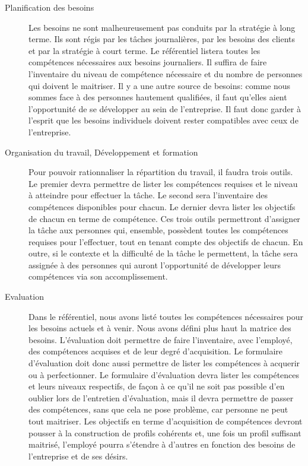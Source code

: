 \begin{description}
  \item[Planification des besoins] 
  Les besoins ne sont malheureusement pas conduits par la stratégie à long terme. Ils sont régis par les tâches journalières, par les besoins des clients et par la stratégie à court terme. Le référentiel listera toutes les compétences nécessaires aux besoins journaliers. Il suffira de faire l'inventaire du niveau de compétence nécessaire et du nombre de personnes qui doivent le maitriser. Il y a une autre source de besoins: comme nous sommes face à des personnes hautement qualifiées, il faut qu'elles aient l'opportunité de se développer au sein de l'entreprise. Il faut donc garder à l'esprit que les besoins individuels doivent rester compatibles avec ceux de l'entreprise. 

  \item[Organisation du travail, Développement et formation]
  Pour pouvoir rationnaliser la répartition du travail, il faudra trois outils. Le premier devra permettre de lister les compétences requises et le niveau à atteindre pour effectuer la tâche. Le second sera l'inventaire des compétences disponibles pour chacun. Le dernier devra lister les objectifs de chacun en terme de compétence. Ces trois outils permettront d'assigner la tâche aux personnes qui, ensemble, possèdent toutes les compétences requises pour l'effectuer, tout en tenant compte des objectifs de chacun. En outre, si le contexte et la difficulté de la tâche le permettent, la tâche sera assignée à des personnes qui auront l'opportunité de développer leurs compétences via son accomplissement. %
  
  \item[Evaluation]
  Dans le référentiel, nous avons listé toutes les compétences nécessaires pour les besoins actuels et à venir. Nous avons défini plus haut la matrice des besoins. L'évaluation doit permettre de faire l'inventaire, avec l'employé, des compétences acquises et de leur degré d'acquisition. Le formulaire d'évaluation doit donc aussi permettre de lister les compétences à acquerir ou à perfectionner. Le formulaire d'évaluation devra lister les compétences et leurs niveaux respectifs, de façon à ce qu'il ne soit pas possible d'en oublier lors de l'entretien d'évaluation, mais il devra permettre de passer des compétences, sans que cela ne pose problème, car personne ne peut tout maitriser. Les objectifs en terme d'acquisition de compétences devront pousser à la construction de profils cohérents et, une fois un profil suffisant maitrisé, l'employé pourra s'étendre à d'autres en fonction des besoins de l'entreprise et de ses désirs. 
  

\end{description}
